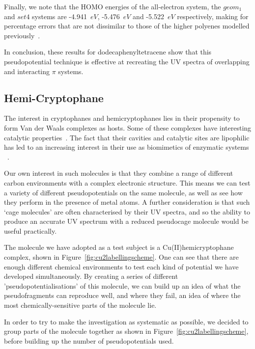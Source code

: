 \documentclass[aip,reprint,nofootinbib]{revtex4-1}
\begin{document}
Finally, we note that the HOMO energies of the all-electron system, the $geom_1$ and $set4$ systems are -4.941~$eV$, -5.476~$eV$ and -5.522~$eV$ respectively, making for percentage errors that are not dissimilar to those of the higher polyenes modelled previously~\cite{punter2019atomic}.

In conclusion, these results for dodecaphenyltetracene show that this pseudopotential technique is effective at recreating the UV spectra of overlapping and interacting $\pi$ systems.

\subsection{Hemi-Cryptophane}

The interest in cryptophanes and hemicryptophanes lies in their propensity to form Van der Waals complexes as hosts. Some of these complexes have interesting catalytic properties~\cite{ikbal_2019}. The fact that their cavities and catalytic sites are lipophilic has led to an increasing interest in their use as biomimetics of enzymatic systems ~\cite{perraud_2013, gosse_2016}. 

Our own interest in such molecules is that they combine a range of different carbon environments with a complex electronic structure. This means we can test a variety of different pseudopotentials on the same molecule, as well as see how they perform in the presence of metal atoms. A further consideration is that such `cage molecules' are often characterised by their UV spectra, and so the ability to produce an accurate UV spectrum with a reduced pseudocage molecule would be useful practically.

The molecule we have adopted as a test subject is a Cu(II)hemicryptophane complex, shown in Figure~\ref{fig:cu2labellingscheme}. One can see that there are enough different chemical environments to test each kind of potential we have developed simultaneously. By creating a series of different 'pseudopotentialisations' of this molecule, we can build up an idea of what the pseudofragments can reproduce well, and where they fail, an idea of where the most chemically-sensitive parts of the molecule lie.

In order to try to make the investigation as systematic as possible, we decided to group parts of the molecule together as shown in Figure~\ref{fig:cu2labellingscheme}, before building up the number of pseudopotentials used. 
\end{document}
